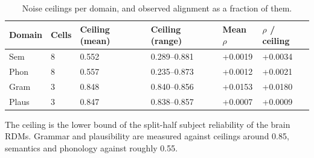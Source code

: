 \begin{table}[t]
\centering
\small
\begin{tabular}{llllll}
\toprule
Domain & Cells & Ceiling (mean) & Ceiling (range) & Mean $\rho$ & $\rho$ / ceiling \\
\midrule
Sem & 8 & 0.552 & 0.289--0.881 & +0.0019 & +0.0034 \\
Phon & 8 & 0.557 & 0.235--0.873 & +0.0012 & +0.0021 \\
Gram & 3 & 0.848 & 0.840--0.856 & +0.0153 & +0.0180 \\
Plaus & 3 & 0.847 & 0.838--0.857 & +0.0007 & +0.0009 \\
\bottomrule
\end{tabular}
\vspace{2pt}
\begin{minipage}{\linewidth}\footnotesize The ceiling is the lower bound of the split-half subject reliability of the brain RDMs. Grammar and plausibility are measured against ceilings around 0.85, semantics and phonology against roughly 0.55.\end{minipage}
\caption{Noise ceilings per domain, and observed alignment as a fraction of them.}
\label{tab:t8}
\end{table}
